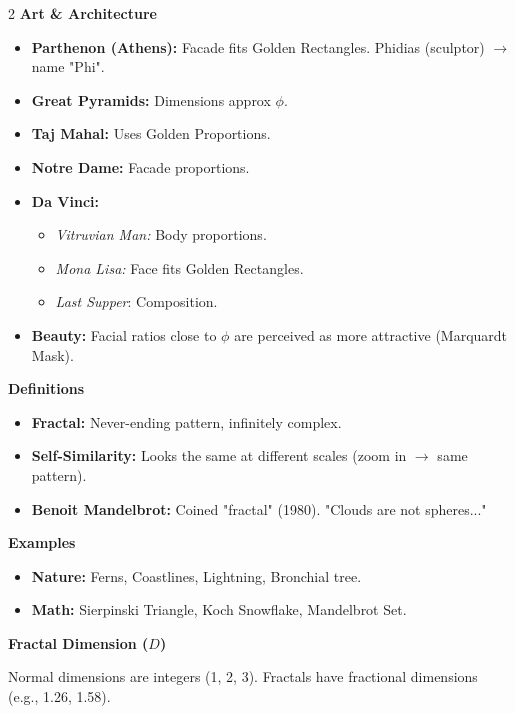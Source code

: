\documentclass[11pt,letterpaper]{article}
\newcommand{\mysection}[1]{%
        \vspace{-0.3em}
        \colorbox{sectioncolor}{\makebox[\linewidth][l]{\bfseries\color{white}#1}}%
        \vspace{0.3em}
    }
\newcommand{\mysubsection}[1]{%
        \vspace{-0.2em}
        {\bfseries\color{sectioncolor}#1}%
        \vspace{0.1em}
    }
\begin{document}
\begin{multicols*}{2}
    \mysubsection{Art \& Architecture}
    \begin{itemize}[leftmargin=*, noitemsep, topsep=0pt]
        \item \textbf{Parthenon (Athens):} Facade fits Golden Rectangles. Phidias (sculptor) $\to$ name "Phi".
        \item \textbf{Great Pyramids:} Dimensions approx $\phi$.
        \item \textbf{Taj Mahal:} Uses Golden Proportions.
        \item \textbf{Notre Dame:} Facade proportions.
        \item \textbf{Da Vinci:}
        \begin{itemize}[leftmargin=*, noitemsep, topsep=0pt]
            \item \textit{Vitruvian Man:} Body proportions.
            \item \textit{Mona Lisa:} Face fits Golden Rectangles.
            \item \textit{Last Supper}: Composition.
        \end{itemize}
        \item \textbf{Beauty:} Facial ratios close to $\phi$ are perceived as more attractive (Marquardt Mask).
    \end{itemize}

    \mysection{3. Fractals}

    \mysubsection{Definitions}
    \begin{itemize}[leftmargin=*, noitemsep, topsep=0pt]
        \item \textbf{Fractal:} Never-ending pattern, infinitely complex.
        \item \textbf{Self-Similarity:} Looks the same at different scales (zoom in $\to$ same pattern).
        \item \textbf{Benoit Mandelbrot:} Coined "fractal" (1980). "Clouds are not spheres..."
    \end{itemize}

    \mysubsection{Examples}
    \begin{itemize}[leftmargin=*, noitemsep, topsep=0pt]
        \item \textbf{Nature:} Ferns, Coastlines, Lightning, Bronchial tree.
        \item \textbf{Math:} Sierpinski Triangle, Koch Snowflake, Mandelbrot Set.
    \end{itemize}

    \mysubsection{Fractal Dimension ($D$)}
    Normal dimensions are integers (1, 2, 3). Fractals have fractional dimensions (e.g., 1.26, 1.58).


\end{multicols*}
\end{document}
